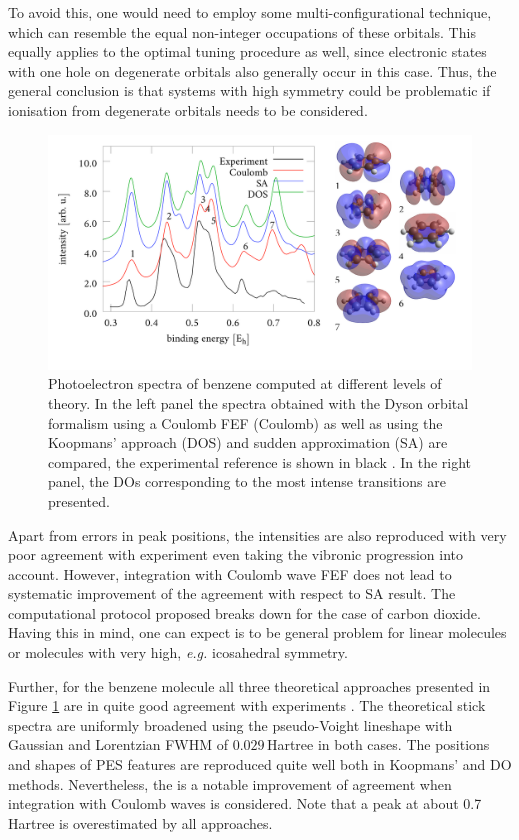 To avoid this, one would need to employ some multi-configurational technique, which can resemble the equal non-integer occupations of these orbitals.
This equally applies to the optimal tuning procedure as well, since electronic states with one hole on degenerate orbitals also generally occur in this case.
Thus, the general conclusion is that systems with high symmetry could be problematic if ionisation from degenerate orbitals needs to be considered.
\begin{figure}
   \includegraphics[width=\textwidth]{Figures/Benzene/Benzene_PES}
   \caption{Photoelectron spectra of benzene computed at different levels of theory.
   In the left panel the spectra obtained with the Dyson orbital formalism using a Coulomb FEF (Coulomb) as well as using the Koopmans' approach (DOS)  and sudden approximation (SA) are compared, the experimental reference is shown in black \cite{BenzExp}.
   In the right panel, the DOs corresponding to the most intense transitions are presented.}
   \label{fig:benzPES}
\end{figure}
Apart from errors in peak positions, the intensities are also reproduced with very poor agreement with experiment even taking the vibronic progression into account.
However, integration with Coulomb wave FEF does not lead to systematic improvement of the agreement with respect to SA result. 
The computational protocol proposed breaks down for the case of carbon dioxide.
Having this in mind, one can expect is to be general problem for linear molecules or molecules with very high, \textit{e.g.} icosahedral symmetry.

Further, for the benzene molecule all three theoretical approaches presented in Figure \ref{fig:benzPES} are in quite good agreement with experiments \cite{BenzExp}.
The theoretical stick spectra are uniformly broadened using the pseudo-Voight lineshape with Gaussian and Lorentzian FWHM of $0.029\,$Hartree in both cases.
The positions and shapes of PES features are reproduced quite well both in Koopmans' and DO methods.
Nevertheless, the is a notable improvement of agreement when integration with Coulomb waves is considered.
Note that a peak at about 0.7 Hartree is overestimated by all approaches.

